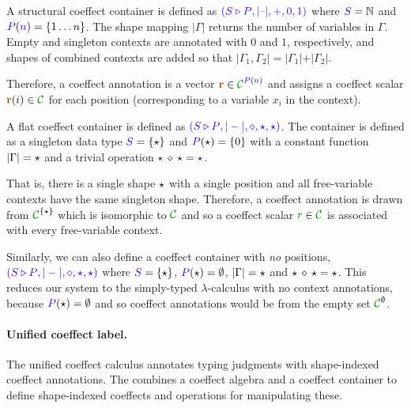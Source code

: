 \begin{example}
\label{ex:further-struct-shape}
A structural coeffect container is defined as $\sclrd{(\SHP, {|}\textnormal{--}{|}, +, 0, 1)}$
where $\SH=\mathbb{N}$ and $\SP(\sclrd{n})=\{ 1 \ldots n \}$. The shape mapping ${|}\Gamma{|}$ returns the
number of variables in $\Gamma$. Empty and singleton contexts are annotated with $0$ and $1$,
respectively, and shapes of combined contexts are added so that ${|}\Gamma_1, \Gamma_2{|} =
{|}\Gamma_1{|} + {|}\Gamma_2{|}$.

Therefore, a coeffect annotation is a vector
$\aclrd{\textbf{r}} \in \C^{\SP(\sclrd{n})}$ and assigns a coeffect scalar $\aclrd{\textbf{r}}(i) \in \C$
for each position (corresponding to a variable $x_i$ in the context).
\end{example}

\begin{example}
\label{ex:further-flat-shape}
A flat coeffect container is defined as $\sclrd{(\SHP, {|}-{|}, \diamond, \sflat, \sflat)}$.
The container is defined as a singleton data type $\SH = \{\sflat \}$ and $\SP(\sflat) = \{ 0 \}$
with a constant function ${|}\Gamma{|}=\star$ and a trivial operation $\star\,\diamond\,\star = \star$.

That is, there is a single shape
$\star$ with a single position and all free-variable contexts have the same singleton shape.
Therefore, a coeffect annotation is drawn from $\C^{\{\sflat\}}$ which is isomorphic to $\C$
and so a coeffect scalar $\cclrd{r}\in \C$ is associated with every free-variable context.
\end{example}

\begin{example}
Similarly, we can also define a coeffect container with \emph{no} positions,
\ie~$\sclrd{(\SHP, {|}-{|}, \diamond, \sflat, \sflat)}$ where $\SH = \{\sflat \}$, $\SP(\sflat) = \emptyset$,
${|}\Gamma{|}=\star$ and $\star\,\diamond\,\star = \star$.
This reduces our system to the simply-typed $\lambda$-calculus with no context annotations, because
$\SP(\sflat)=\emptyset$ and so coeffect annotations would be from the empty set $\C^\emptyset$.
\end{example}


\paragraph{Unified coeffect label.}
The unified coeffect calculus annotates typing judgments with shape-indexed coeffect annotations.
The \emph{} combines a coeffect algebra and a coeffect container
to define shape-indexed coeffects and operations for manipulating these.

